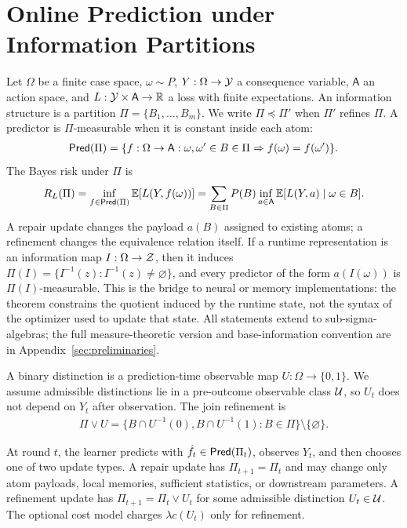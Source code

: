 \section{Online Prediction under Information Partitions}
\label{sec:main-setup}

Let $\Omega$ be a finite case space, $\omega\sim P$, $Y:\Omega\to\mathcal{Y}$ a consequence variable, $\mathsf A$ an action space, and $L:\mathcal{Y}\times\mathsf A\to\mathbb{R}$ a loss with finite expectations. An information structure is a partition $\Pi=\{B_1,\ldots,B_m\}$. We write $\Pi\preceq\Pi'$ when $\Pi'$ refines $\Pi$. A predictor is $\Pi$-measurable when it is constant inside each atom:
\begin{align*}
\mathsf{Pred}(\Pi)
=
\{f:\Omega\to\mathsf A:
\omega,\omega'\in B\in\Pi \Rightarrow f(\omega)=f(\omega')\}.
\end{align*}
The Bayes risk under $\Pi$ is
\begin{align*}
R_L(\Pi)
=
\inf_{f\in\mathsf{Pred}(\Pi)}\operatorname*{\mathbb{E}}[L(Y,f(\omega))]
=
\sum_{B\in\Pi}P(B)\inf_{a\in\mathsf A}\operatorname*{\mathbb{E}}[L(Y,a)\mid \omega\in B].
\end{align*}
A repair update changes the payload $a(B)$ assigned to existing atoms; a refinement changes the equivalence relation itself. If a runtime representation is an information map $I:\Omega\to\mathcal{Z}$, then it induces $\Pi(I)=\{I^{-1}(z):I^{-1}(z)\ne\varnothing\}$, and every predictor of the form $a(I(\omega))$ is $\Pi(I)$-measurable. This is the bridge to neural or memory implementations: the theorem constrains the quotient induced by the runtime state, not the syntax of the optimizer used to update that state. All statements extend to sub-sigma-algebras; the full measure-theoretic version and base-information convention are in Appendix~\ref{sec:preliminaries}.

A binary distinction is a prediction-time observable map $U:\Omega\to\{0,1\}$. We assume admissible distinctions lie in a pre-outcome observable class $\mathcal{U}$, so $U_t$ does not depend on $Y_t$ after observation. The join refinement is
\begin{align*}
\Pi\vee U
=
\{B\cap U^{-1}(0),B\cap U^{-1}(1):B\in\Pi\}\setminus\{\varnothing\}.
\end{align*}

\begin{definition}
\label{def:main-repair-refinement}
At round $t$, the learner predicts with $\hat f_t\in\mathsf{Pred}(\Pi_t)$, observes $Y_t$, and then chooses one of two update types. A repair update has $\Pi_{t+1}=\Pi_t$ and may change only atom payloads, local memories, sufficient statistics, or downstream parameters. A refinement update has $\Pi_{t+1}=\Pi_t\vee U_t$ for some admissible distinction $U_t\in\mathcal{U}$. The optional cost model charges $\lambda c(U_t)$ only for refinement.
\end{definition}

